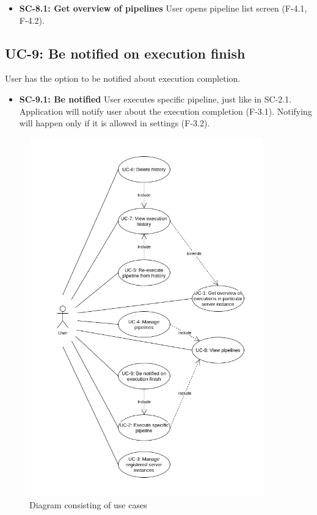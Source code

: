 \begin{itemize}
\item \textbf{SC-8.1: Get overview of pipelines}
User opens pipeline list screen (F-4.1, F-4.2).

\end{itemize}

\subsection*{UC-9: Be notified on execution finish}
User has the option to be notified about execution completion.

\begin{itemize}
\item \textbf{SC-9.1: Be notified}
User executes specific pipeline, just like in SC-2.1. Application will notify user about the execution completion (F-3.1). Notifying will happen only if it is allowed in settings (F-3.2).

\end{itemize}

\begin{figure}\centering
	\includegraphics[width=0.9\textwidth]{pics/bc-uc.png}
	\caption[Use cases]{Diagram consisting of use cases}\label{fig:uc}
\end{figure}